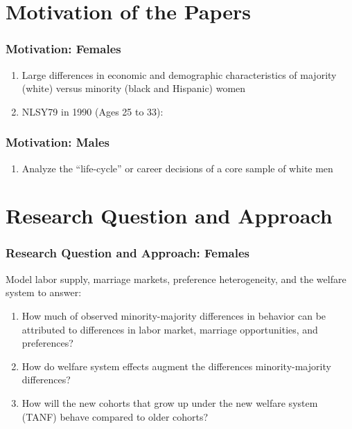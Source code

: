 \section{Motivation of the Papers}
\begin{frame}
	\frametitle{Motivation: Females}
	\begin{enumerate}
		\item Large differences in economic and demographic characteristics of majority (white) versus minority (black and Hispanic) women
		\item NLSY79 in 1990 (Ages 25 to 33):
	\end{enumerate}
\end{frame}

\begin{frame}
	\frametitle{Motivation: Males}	
	\begin{enumerate}
		\item Analyze the ``life-cycle'' or career decisions of a core sample of white men
	\end{enumerate}
\end{frame}

\section{Research Question and Approach}
\begin{frame}
	\frametitle{Research Question and Approach: Females}
		\begin{wideitemize}
			\item Model labor supply, marriage markets, preference heterogeneity, and the welfare system to answer:
			\begin{enumerate}
			\item How much of observed minority-majority differences in behavior can be attributed to differences in labor market, marriage opportunities, and preferences?
			\item How do welfare system effects augment the differences minority-majority differences?
			\item How will the new cohorts that grow up under the new welfare system (TANF) behave compared to older cohorts?
			\end{enumerate}
		\end{wideitemize}	
\end{frame}

